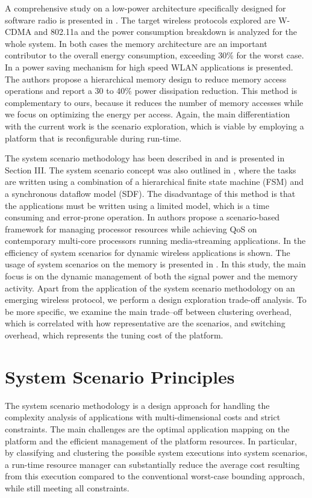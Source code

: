 A comprehensive study on a low-power architecture specifically designed for software radio is presented in \cite{22}. The target wireless protocols explored are W-CDMA and 802.11a and the power consumption breakdown is analyzed for the whole system. In both cases the memory architecture are an important contributor to the overall energy consumption, exceeding 30\% for the worst case. In \cite{23} a power saving mechanism for high speed WLAN applications is presented. The authors propose a hierarchical memory design to reduce memory access operations and report a 30 to 40\% power dissipation reduction. This method is complementary to ours, because it reduces the number of memory accesses while we focus on optimizing the energy per access. Again, the main differentiation with the current work is the scenario exploration, which is viable by employing a platform that is reconfigurable during run-time.

The system scenario methodology has been described in \cite{13} and is presented in Section III. The system scenario concept was also outlined in \cite{15}, where the tasks are written using a combination of a hierarchical finite state machine (FSM) and a synchronous dataflow model (SDF). The disadvantage of this method is that the applications must be written using a limited model, which is a time consuming and error-prone operation. In \cite{16} authors propose a scenario-based framework for managing processor resources while achieving QoS on contemporary multi-core processors running media-streaming applications. In \cite{21} the efficiency of system scenarios for dynamic wireless applications is shown. The usage of system scenarios on the memory is presented in \cite{Fil12}. In this study, the main focus is on the dynamic management of both the signal power and the memory activity. Apart from the application of the system scenario methodology on an emerging wireless protocol, we perform a design exploration trade-off analysis. To be more specific, we examine the main trade–off between clustering overhead, which is correlated with how representative are the scenarios, and switching overhead, which represents the tuning cost of the platform.

\section{System Scenario Principles}

The system scenario methodology is a design approach for handling the complexity analysis of applications with multi-dimensional costs and strict constraints. The main challenges are the optimal application mapping on the platform and the efficient management of the platform resources. In particular, by classifying and clustering the possible system executions into system scenarios, a run-time resource manager can substantially reduce the average cost resulting from this execution compared to the conventional worst-case bounding approach, while still meeting all constraints.

